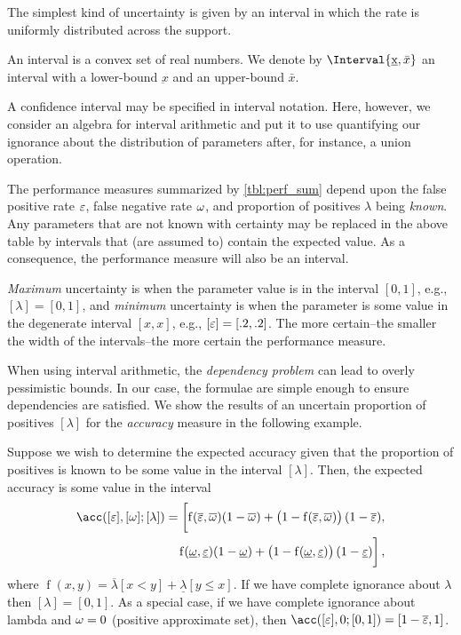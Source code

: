 \documentclass[10pt,final,hidelinks]{article}
\numberwithin{equation}{section}
\begin{document}
The simplest kind of uncertainty is given by an interval in which the rate is uniformly distributed across the support.
\begin{definition}
An interval is a convex set of real numbers.
We denote by $\Interval{\underbar{x},\bar{x}}$ an interval with a lower-bound $\underbar{x}$ and an upper-bound $\bar{x}$.
\end{definition}

A confidence interval may be specified in interval notation.
Here, however, we consider an algebra for interval arithmetic and put it to use quantifying our ignorance about the distribution of parameters after, for instance, a union operation.

The performance measures summarized by \cref{tbl:perf_sum} depend upon the false positive rate $\varepsilon$, false negative rate $\omega$, and proportion of positives $\lambda$ being \emph{known}.
Any parameters that are not known with certainty may be replaced in the above table by intervals that (are assumed to) contain the expected value.
As a consequence, the performance measure will also be an interval.

\emph{Maximum} uncertainty is when the parameter value is in the interval $[0,1]$, e.g., $[\lambda] = [0,1]$, and \emph{minimum} uncertainty is when the parameter is some value in the degenerate interval $[x,x]$, e.g., $[\varepsilon] = [.2,.2]$. The more certain--the smaller the width of the intervals--the more certain the performance measure.

When using interval arithmetic, the \emph{dependency problem} can lead to overly pessimistic bounds.
In our case, the formulae are simple enough to ensure dependencies are satisfied. We show the results of an uncertain proportion of positives $[\lambda]$ for the \emph{accuracy} measure in the following example.

\begin{example}
	Suppose we wish to determine the expected accuracy given that the proportion of positives is known to be some value in the interval 
	$[\lambda]$. Then, the expected accuracy is some value in the interval
	\begin{equation}
		\begin{split}
		\acc([\fprate],[\fnrate] ; [\lambda]) =
		\biggl[
		\operatorname{f}(\overline{\fprate},\overline{\fnrate})(1-\overline{\fnrate}) + 
		\left(1-\operatorname{f}(\overline{\fprate},\overline{\fnrate})\right)(1-\overline{\fprate}),\\
		\operatorname{f}(\underline{\fnrate},\underline{\fprate})(1-\underline{\fnrate}) + 
		\left(1-\operatorname{f}(\underline{\fnrate},\underline{\fprate})\right)(1-\underline{\fprate})
		\biggr]\,,
		\end{split}
		\end{equation}
		where $\operatorname{f}(x,y) = \overline{\lambda}[x < y] + 
		\underline{\lambda}[y \leq x]$. If we have complete ignorance about 
		$\lambda$ then $[\lambda] = [0,1]$. As a special case, if we have 
		complete 
		ignorance about lambda and $\omega = 0$ (positive approximate set), 
		then 
		$\acc([\fprate],0 ; [0,1]) = [1-\overline{\fprate}, 1]$.
\end{example}
\end{document}
